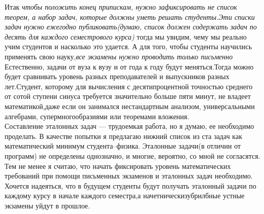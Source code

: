 \documentclass{article}
\begin{document}
{Итак \emph{чтобы положить конец припискам, нужно зафиксировать не список теорем, а набор задач, которые должны уметь решать студенты.Эти списки задач нужно ежегодно публиковать(думаю, список должен содержать задач по десять для каждого семестрового курса)} тогда мы увидим, чему мы реально учим студентов и насколько это удается. А для того, чтобы студенты научились применять свою науку,\emph{все экзамены нужно проводить только письменно}\\
Естественно, задачи от вуза к вузу и от года к году будут меняться.Тогда можно будет сравнивать уровень разных преподавателей и выпускников разных лет.Студент, которому для вычисления с десятипроцентной точностью среднего от сотой ступени синуса требуется значительно больше пяти минут, не владеет математикой,даже если он занимался нестандартным анализом, универсальными алгебрами, супермногообразиями или теоремами вложения.\\
Составление эталонных задач --- трудоемкая работа, но я думаю, ее необходимо проделать. В качестве попытки я предлагаю нижний список из ста задач как математический минимум студента--физика. Эталонные задачи(в отличии от программ) не определены однозначно, и многие, вероятно, со мной не согласятся. Тем не менее я считаю, что начать фиксировать уровень математических требований при помощи письменных экзаменов и эталонных задач необходимо. Хочется надеяться, что в будущем студенты будут получать эталонный задачи по каждому курсу в начале каждого семестра,а начетническизубрилбные устные экзамены уйдут в прошлое.}\\
\end{document}
